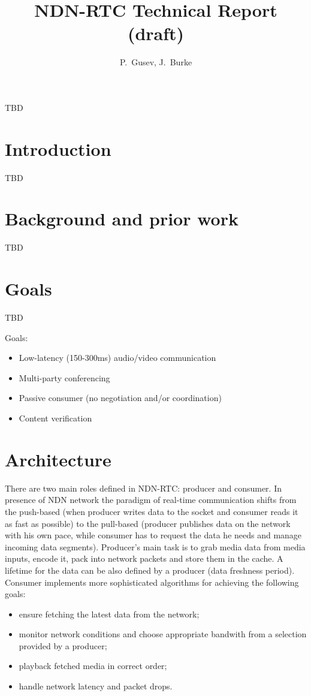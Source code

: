 \documentclass[10pt]{proc}
\author{P.~Gusev, J.~Burke}
\title{NDN-RTC Technical Report (draft)}
\begin{document}
\maketitle

\abstract
TBD

\section{Introduction}
TBD

\section{Background and prior work}
TBD

\section{Goals}
TBD

Goals:

\begin{itemize}
\item Low-latency (150-300ms) audio/video communication
\item Multi-party conferencing
\item Passive consumer (no negotiation and/or coordination)
\item Content verification
\end{itemize}

\section{Architecture}
There are two main roles defined in NDN-RTC: producer and consumer. In presence of NDN network the paradigm of real-time communication shifts from the push-based (when producer writes data to the socket and consumer reads it as fast as possible) to the pull-based (producer publishes data on the network with his own pace, while consumer has to request the data he needs and manage incoming data segments).
Producer's main task is to grab media data from media inputs, encode it, pack into network packets and store them in the cache. A lifetime for the data can be also defined by a producer (data freshness period).
Consumer implements more sophisticated algorithms for achieving the following goals:
\begin{itemize}
\item ensure fetching the latest data from the network; 
\item monitor network conditions and choose appropriate bandwith from a selection provided by a producer;  
\item playback fetched media in correct order;
\item handle network latency and packet drops.
\end{itemize}
\end{document}
